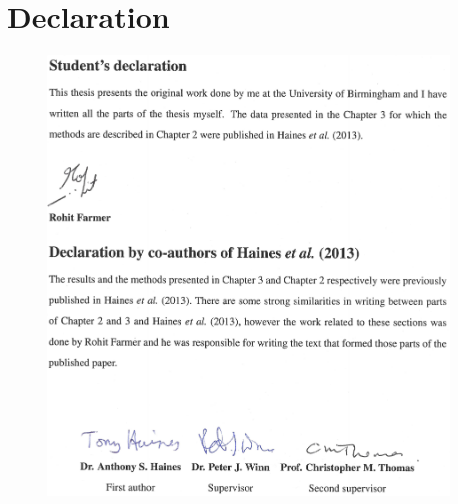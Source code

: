 \chapter*{Declaration}

		\begin{figure}[htbp]
		\centering
		\includegraphics[width=0.95\textwidth,keepaspectratio=true]{graphics/declarationFormSigned.pdf}
		\end{figure}
	
